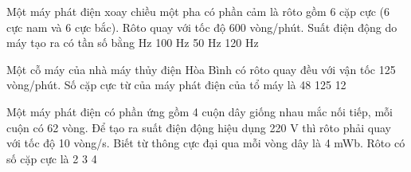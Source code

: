 \begin{vidu} %
	 Một máy phát điện xoay chiều một pha có phần cảm là rôto gồm 6 cặp cực (6 cực nam và 6 cực bắc). Rôto quay với tốc độ 600 vòng/phút. Suất điện động do máy tạo ra có tần số bằng
	\choice
	{ Hz}
	{100 Hz}
	{50 Hz}
	{120 Hz}
\end{vidu}
\begin{vidu} %
	Một cỗ máy của nhà máy thủy điện Hòa Bình có rôto quay đều với vận tốc 125 vòng/phút. Số cặp cực từ của máy phát điện của tổ máy là
	\choice
	{}
	{48}
	{125}
	{12}
\end{vidu}
\begin{vidu} %
	Một máy phát điện có phần ứng gồm 4 cuộn dây giống nhau mắc nối tiếp, mỗi cuộn có 62 vòng. Để tạo ra suất điện động hiệu dụng 220 V thì rôto phải quay với tốc độ 10 vòng/s. Biết từ thông cực đại qua mỗi vòng dây là 4 mWb. Rôto có số cặp cực là
	\choice
	{2}
	{3}
	{4}
	{}
\end{vidu}
